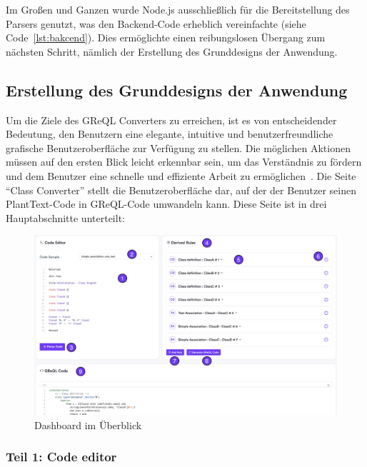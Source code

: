 Im Großen und Ganzen wurde Node.js ausschließlich für die Bereitstellung des Parsers genutzt, was den Backend-Code
erheblich vereinfachte (siehe Code~\ref{lst:bakcend}). Dies ermöglichte einen reibungslosen Übergang zum nächsten Schritt, nämlich
der Erstellung des Grunddesigns der Anwendung.

\subsection{Erstellung des Grunddesigns der Anwendung}\label{subsec:erstellung-des-grunddesigns-der-anwendung}

Um die Ziele des \gls{GReQL Converter}s zu erreichen, ist es von entscheidender Bedeutung, den Benutzern eine elegante,
intuitive und benutzerfreundliche grafische Benutzeroberfläche zur Verfügung zu stellen. Die möglichen Aktionen müssen
auf den ersten Blick leicht erkennbar sein, um das Verständnis zu fördern und dem Benutzer eine schnelle und effiziente
Arbeit zu ermöglichen~\cite{guntupalli2008user}. Die Seite ``Class Converter'' stellt die Benutzeroberfläche dar, auf
der der Benutzer seinen PlantText-Code in GReQL-Code umwandeln kann. Diese Seite ist in drei Hauptabschnitte unterteilt:

\begin{figure}[h]
    \centering
    \includegraphics[width=16cm]{images/board}
    \caption{Dashboard im Überblick}
    \label{fig:dashboard}
\end{figure}

\subsubsection{Teil 1: Code editor}

